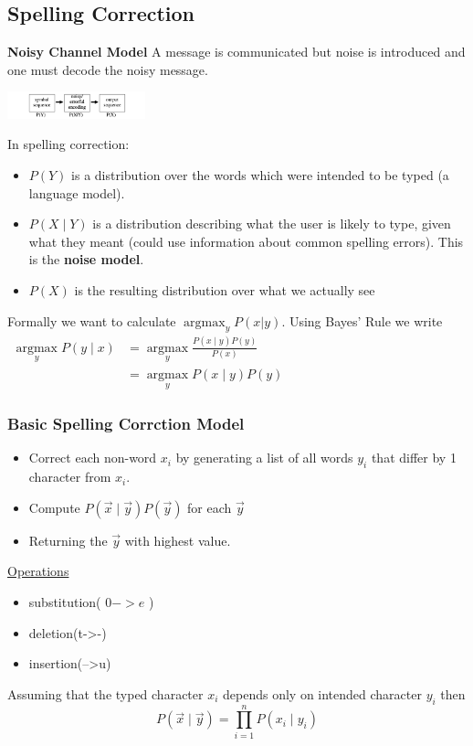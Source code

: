 \documentclass[8pt]{extarticle} %
\begin{document}
\begin{multicols*}{3}
\subsection*{Spelling Correction}
\textbf{Noisy Channel Model} A message is communicated but noise is introduced and one must decode the noisy message.
\begin{center}
    \includegraphics[width=0.3\textwidth]{media/noisy-channel.png}
\end{center}
In spelling correction:
\begin{itemize}[label=\textbullet, labelsep=0.3em, leftmargin=0.5em, itemsep=0em]
\item $P(Y)$ is a distribution over the words which were intended to be typed (a language model).
\item $P(X \mid Y)$ is a distribution describing what the user is likely to type, given what they meant (could use information about common spelling errors). This is the \textbf{noise model}.
\item $P(X)$ is the resulting distribution over what we actually see
\end{itemize}
Formally we want to calculate $\operatorname{argmax}_{y}P(x|y)$.
Using Bayes' Rule we write
$\begin{aligned} 
    \underset{y}{\operatorname{argmax}} P(y \mid x) & =\underset{y}{\operatorname{argmax}} \frac{P(x \mid y) P(y)}{P(x)} \\ 
    & =\underset{y}{\operatorname{argmax}} P(x \mid y) P(y)
\end{aligned}$

\subsubsection*{Basic Spelling Corrction Model}
\begin{itemize}[label=\textbullet, labelsep=0.3em, leftmargin=0.5em, itemsep=0em]
\item Correct each non-word $x_i$ by generating a list of all words $y_i$ that differ by 1 character from $x_i$.
\item Compute $P(\vec{x} \mid \vec{y}) P(\vec{y})$ for each $\vec{y}$ 
\item Returning the $\vec{y}$ with highest value. 
\end{itemize}

\underline{Operations}
\begin{itemize}[label=\textbullet, labelsep=0.3em, leftmargin=0.5em, itemsep=0em]
    \item substitution( $0->e$ )
    \item deletion(t->-)
    \item insertion(-->u)
\end{itemize}
Assuming that the typed character $x_i$ depends only on intended character $y_i$ then
$$
P(\vec{x} \mid \vec{y})=\prod_{i=1}^n P\left(x_i \mid y_i\right)
$$


\end{multicols*}
\end{document}
